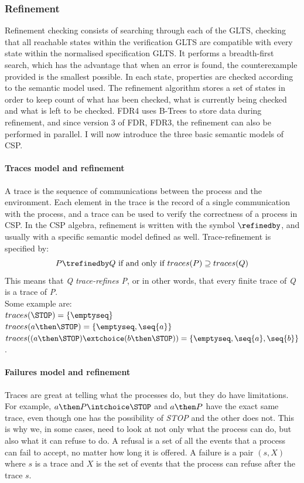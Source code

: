 \subsubsection{Refinement}
\label{sec:refinement}
Refinement checking consists of searching through each of the GLTS, checking that all reachable states within the verification GLTS are compatible with every state within the normalised specification GLTS. It performs a breadth-first search, which has the advantage that when an error is found, the counterexample provided is the smallest possible. In each state, properties are checked according to the semantic model used. The refinement algorithm stores a set of states in order to keep count of what has been checked, what is currently being checked and what is left to be checked. FDR4 uses B-Trees to store data during refinement, and since version 3 of FDR, FDR3, the refinement can also be performed in parallel.
I will now introduce the three basic semantic models of CSP.
\paragraph{Traces model and refinement}
A trace is the sequence of communications between the process and the environment. Each element in the trace is the record of a single communication with the process, and a trace can be used to verify the correctness of a process in CSP. In the CSP algebra, refinement is written with the symbol $\refinedby$, and usually with a specific semantic model defined as well. Trace-refinement is specified by:
$$P \trefinedby Q \text{ if and only if } traces(P) \supseteq traces(Q)$$
This means that \textit{Q trace-refines P}, or in other words, that every finite trace of \textit{Q} is a trace of \textit{P}. \\
Some example are:\\
$traces(\STOP) = \{\emptyseq\}$\\
$traces(a \then \STOP) = \{\emptyseq, \seq{a}\}$\\
$traces((a \then \STOP)\extchoice (b \then \STOP)) = \{\emptyseq, \seq{a}, \seq{b}\}$.
\paragraph{Failures model and refinement}
Traces are great at telling what the processes do, but they do have limitations. For example, $a \then P \intchoice \STOP$ and $a \then P$ have the exact same trace, even though one has the possibility of \textit{STOP} and the other does not. This is why we, in some cases, need to look at not only what the process can do, but also what it can refuse to do. A refusal is a set of all the events that a process can fail to accept, no matter how long it is offered. A failure is a pair $(s, X)$ where $s$ is a trace and $X$ is the set of events that the process can refuse after the trace $s$.\\

